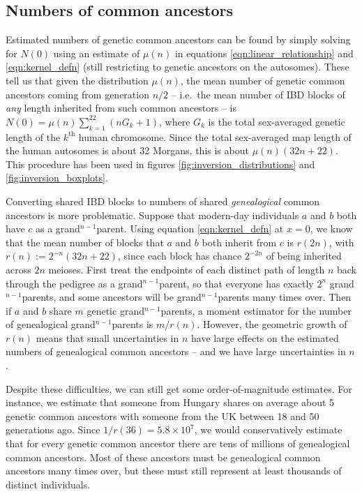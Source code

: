 \documentclass{article}
\begin{document}
\subsection{Numbers of common ancestors}
\label{ss:numbers_of_ancestors}

Estimated numbers of genetic common ancestors can be found by simply solving for $N(0)$ using an estimate of $\mu(n)$ in 
equations \eqref{eqn:linear_relationship} and \eqref{eqn:kernel_defn}
(still restricting to genetic ancestors on the autosomes).
These tell us that given the distribution $\mu(n)$,
the mean number of genetic common ancestors coming from generation $n/2$ --
i.e.\ the mean number of IBD blocks of {\em any} length inherited from such common ancestors --
is $N(0) = \mu(n) \sum_{k=1}^{22} \left( n G_k + 1 \right)$, where
$G_k$ is the total sex-averaged genetic length of the $k^\mathrm{th}$ human chromosome.
Since the total sex-averaged map length of the human autosomes is about 32 Morgans, this is about $\mu(n) ( 32 n + 22 )$.
This procedure has been used in figures \ref{fig:inversion_distributions} and \ref{fig:inversion_boxplots}.

Converting shared IBD blocks to numbers of shared {\em genealogical} common ancestors is more problematic.
Suppose that modern-day individuals $a$ and $b$ both have $c$ as a grand$^{n-1}$parent.
Using equation \eqref{eqn:kernel_defn} at $x=0$, 
we know that the mean number of blocks that $a$ and $b$ both inherit from $c$
is $r(2n)$, with $r(n):=2^{-n}(32n+22)$, since each block has chance $2^{-2n}$ of being inherited across $2n$ meioses.
First treat the endpoints of each distinct path of length $n$ back through the pedigree as a grand$^{n-1}$parent,
so that everyone has exactly $2^n$ grand$^{n-1}$parents,
and some ancestors will be grand$^{n-1}$parents many times over.
Then if $a$ and $b$ share $m$ genetic grand$^{n-1}$parents,
a moment estimator for the number of genealogical grand$^{n-1}$parents is $m/r(n)$.
However, the geometric growth of $r(n)$ means that small uncertainties in $n$ 
have large effects on the estimated numbers of genealogical common ancestors
-- and we have large uncertainties in $n$.

Despite these difficulties, we can still get some order-of-magnitude estimates.
For instance, we estimate that someone from Hungary shares on average about 5 genetic common ancestors with someone from the UK
between 18 and 50 generations ago.
Since $1/r(36)=5.8\times10^7$, we would conservatively estimate that for every genetic common ancestor
there are tens of millions of genealogical common ancestors.
Most of these ancestors must be genealogical common ancestors many times over, 
but these must still represent at least thousands of distinct individuals.
\end{document}
